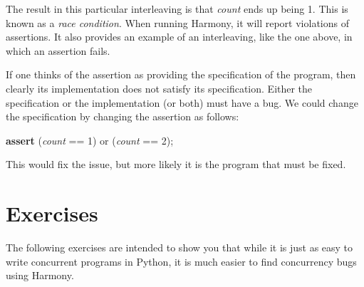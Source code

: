 \documentclass{report}
\newenvironment{code}{
\tcolorbox
}{
\endtcolorbox
}
\begin{document}
The result in this particular interleaving is that \textit{count} ends up
being 1.
This is known as a \emph{race condition}.
%
When running Harmony, it will
report violations of assertions.  It also provides an example
of an interleaving, like the one above, in which an assertion fails.

%

If one thinks of the assertion as providing the specification of the
program, then clearly its implementation does not satisfy its specification.
Either the specification or the implementation (or both) must have a bug.
We could change the specification by changing the assertion as follows:

\begin{code}
\textbf{assert} (\textit{count} == 1) or (\textit{count} == 2);
\end{code}

This would fix the issue, but more likely it is the program that must
be fixed.

\section*{Exercises}

The following exercises are intended to show you that while it is just
as easy to write concurrent programs in Python, it is much easier to
find concurrency bugs using Harmony.
\end{document}
